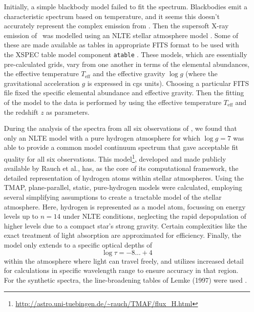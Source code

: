    Initially, a simple blackbody model failed to fit the spectrum. Blackbodies emit a characteristic spectrum based on temperature, and it seems this doesn't accurately represent the complex emission from \source. Then the supersoft X-ray emission of \source\ was modelled using an NLTE stellar atmosphere model \cite{werner1999classical}. Some of these are made available as tables in appropriate FITS format to be used with the XSPEC table model component \texttt{atable} \cite{rauch2003grid,rauch2010nlte}. These models, which are essentially pre-calculated grids, vary from one another in terms of the elemental abundances, the effective temperature $T_\text{eff}$ and the effective gravity $\log{g}$ (where the gravitational acceleration $g$ is expressed in cgs units). Choosing a particular FITS file fixed the specific elemental abundance and effective gravity. Then the fitting of the model to the data is performed by using the effective temperature $T_\text{eff}$ and the redshift $z$ as parameters.
    
    During the analysis of the spectra from all six observations of \source, we found that only an NLTE model with a pure hydrogen atmosphere for which $\log{g}=7$ was able to provide a common model continuum spectrum that gave acceptable fit quality for all six observations. This model\footnote{\url{http://astro.uni-tuebingen.de/~rauch/TMAF/flux_H.html}}, developed and made publicly available by Rauch et al., has, as the core of its computational framework, the detailed representation of hydrogen atoms within stellar atmospheres. Using the TMAP,  plane-parallel, static, pure-hydrogen models were calculated, employing several simplifying assumptions to create a tractable model of the stellar atmosphere. Here, hydrogen is represented as a model atom, focussing on energy levels up to $n=14$ under NLTE conditions, neglecting the rapid depopulation of higher levels due to a compact star's strong gravity. Certain complexities like the exact treatment of light absorption are approximated for efficiency. Finally, the model only extends to a specific optical depths of
    $$\log{\tau}=-8\dots+4$$
    within the atmosphere where light can travel freely, and utilizes increased detail for calculations in specific wavelength range to ensure accuracy in that region. For the synthetic spectra, the line-broadening tables of Lemke (1997) were used \cite{lemke1997extended}.
    

